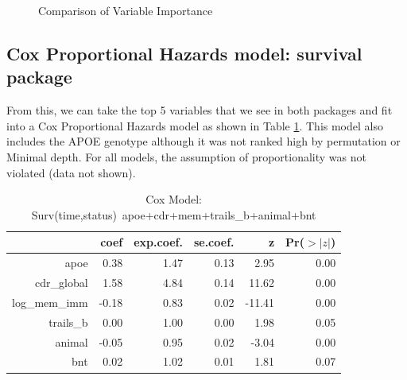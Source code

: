 \documentclass[a4paper,man,natbib,11pt]{article}
\begin{document}
\begin{figure}[h!]%
    \centering
    \qquad
    \caption{Comparison of Variable Importance}%
    \label{fig:ggVI}%
\end{figure}

\subsection{Cox Proportional Hazards model: survival package}

From this, we can take the top 5 variables that we see in both packages and fit into a Cox Proportional Hazards model as shown in Table \ref{cox_coef}. This model also includes the APOE genotype although it was not ranked high by permutation or Minimal depth. For all models, the assumption of proportionality was not violated (data not shown).   

\begin{table}[ht]
\centering
\caption{Cox Model: Surv(time,status)~apoe+cdr+mem+trails\_b+animal+bnt}
\begin{tabular}{rrrrrr}
  \hline
 & coef & exp.coef. & se.coef. & z & Pr($>$$|z|$) \\ 
  \hline
apoe & 0.38 & 1.47 & 0.13 & 2.95 & 0.00 \\ 
  cdr\_global & 1.58 & 4.84 & 0.14 & 11.62 & 0.00 \\ 
  log\_mem\_imm & -0.18 & 0.83 & 0.02 & -11.41 & 0.00 \\ 
  trails\_b & 0.00 & 1.00 & 0.00 & 1.98 & 0.05 \\ 
  animal & -0.05 & 0.95 & 0.02 & -3.04 & 0.00 \\ 
  bnt & 0.02 & 1.02 & 0.01 & 1.81 & 0.07 \\ 
   \hline
\end{tabular}
\label{cox_coef}
\end{table}
\end{document}
